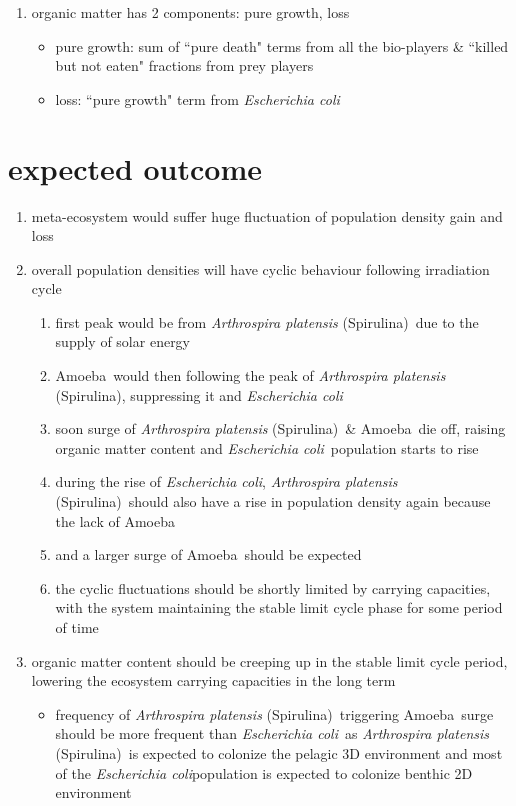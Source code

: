 \documentclass[a4paper,11pt]{article}
\newcommand{\ec}{\textit{Escherichia coli}}
\newcommand{\am}{Amoeba}
\newcommand{\ap}{\textit{Arthrospira platensis} (Spirulina)}
\begin{document}
\begin{enumerate}
        \item organic matter has 2 components: pure growth, loss
        \begin{itemize}
            \item pure growth: sum of ``pure death" terms from all the bio-players \& ``killed but not eaten" fractions from prey players
            \item loss: ``pure growth" term from \ec
        \end{itemize}
    \end{enumerate}
    
    \section{expected outcome}
    \begin{enumerate}
        \item meta-ecosystem would suffer huge fluctuation of population density gain and loss
        \item overall population densities will have cyclic behaviour following irradiation cycle
        \begin{enumerate}
            \item first peak would be from \ap\ due to the supply of solar energy
            \item \am\ would then following the peak of \ap, suppressing it and \ec
            \item soon surge of \ap\ \& \am\ die off, raising organic matter content and \ec\ population starts to rise
            \item during the rise of \ec, \ap\ should also have a rise in population density again because the lack of \am
            \item and a larger surge of \am\ should be expected
            \item the cyclic fluctuations should be shortly limited by carrying capacities, with the system maintaining the stable limit cycle phase for some period of time
        \end{enumerate}
        \item organic matter content should be creeping up in the stable limit cycle period, lowering the ecosystem carrying capacities in the long term
        \begin{itemize}
            \item frequency of \ap\ triggering \am\ surge should be more frequent than \ec\ as \ap\ is expected to colonize the pelagic 3D environment and most of the \ec population is expected to colonize benthic 2D environment

\end{itemize}
\end{enumerate}
\end{document}
